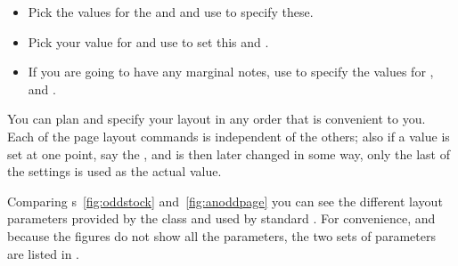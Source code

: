 \begin{itemize}
\item Pick the values for the \lnc{\headheight} and \lnc{\footskip}
  and use \cmd{\setheadfoot} to specify
  these.

\item Pick your value for \cmd{\headskip} and use
  \cmd{\setheaderspaces} to set this and \lnc{\headmargin}.

\item If you are going to have any marginal notes,
  use \cmd{\setmarginnotes} to specify the values for
  \lnc{\marginparsep}, \lnc{\marginparwidth} and \lnc{\marginparpush}.

\end{itemize}

    You can plan and specify your layout in any order that is 
convenient to you. Each of the page layout commands is independent of the 
others; also if
a value is set at one point, say the \lnc{\textwidth}, and is then
later changed in some way, only the last of the settings is used as the actual
value.


    Comparing \figurerefname s~\ref{fig:oddstock} and~\ref{fig:anoddpage} 
you can see the different layout parameters 
provided by the class and used by standard
\ltx. For convenience, and because the figures do not show all
the parameters, the two sets of parameters are listed in .

